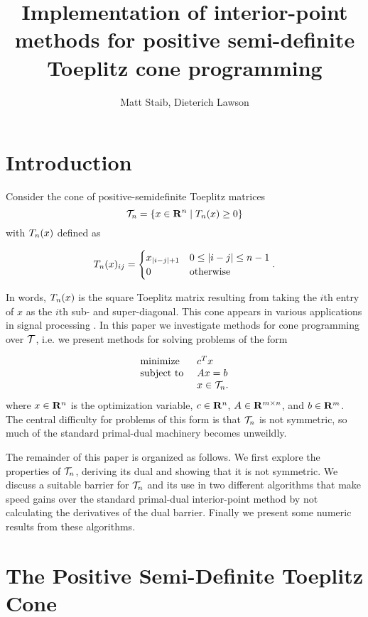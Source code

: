 \documentclass{article}
\title{Implementation of interior-point methods for positive semi-definite Toeplitz cone programming}
\author{Matt Staib, Dieterich Lawson}
\begin{document}
\maketitle
\large
\section{Introduction}
Consider the cone of positive-semidefinite Toeplitz matrices
\[
  \mathcal{T}_n = \{x \in \mathbf{R}^n \mid T_n(x) \geq 0\}
\]
with $T_n(x)$ defined as

\[
  T_n(x)_{ij} = \begin{cases}
      x_{|i-j|+1} &  0 \leq |i-j| \leq n-1 \\
      0 & \mbox{otherwise}
\end{cases}.
\]

In words, $T_n (x)$ is the square Toeplitz matrix resulting from taking the $i$th
entry of $x$ as the $i$th sub- and super-diagonal. This cone appears in various applications
in signal processing . In this paper we investigate methods for cone programming
over $\mathcal{T}$, i.e. we present methods for solving problems of the form

\begin{equation}\label{primal}
  \begin{array}{ll}
    \mbox{minimize}    & c^Tx \\
    \mbox{subject to } & Ax = b \\
                       & x \in \mathcal{T}_n. 
  \end{array}
\end{equation}
where $x\in \mathbf{R}^n$ is the optimization variable, $c \in \mathbf{R}^n$, $A \in \mathbf{R}^{m\times n}$, 
and $b \in \mathbf{R}^m$. The central difficulty for problems of this form is that $\mathcal{T}_n$
is not symmetric, so much of the standard primal-dual machinery becomes unweildly.

The remainder of this paper is organized as follows. We first explore the properties of 
$\mathcal{T}_n$, deriving its dual and showing that it is not symmetric.  We discuss a suitable 
barrier for $\mathcal{T}_n$ and its use in two different algorithms that make speed gains 
over the standard primal-dual interior-point method by not calculating the derivatives
of the dual barrier. Finally we present some numeric results from these algorithms. 

\section{The Positive Semi-Definite Toeplitz Cone}
\end{document}
